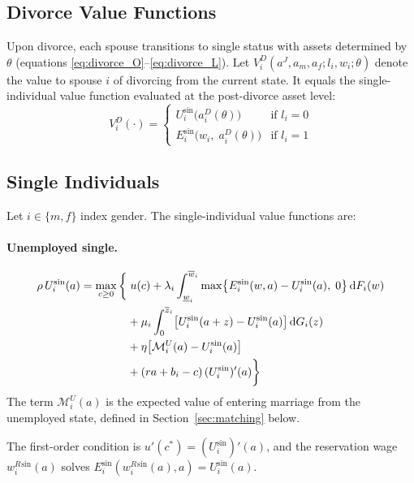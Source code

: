 \documentclass[11pt]{article}
\newcommand{\aJ}{a^{J}}
\newcommand{\wR}{w^{R}}
\newcommand{\dF}{\,\mathrm{d}F}
\newcommand{\dG}{\,\mathrm{d}G}
\begin{document}
\subsection{Divorce Value Functions}

Upon divorce, each spouse transitions to single status with assets determined by $\theta$ (equations \eqref{eq:divorce_O}--\eqref{eq:divorce_L}). Let $V_i^D(\aJ, a_m, a_f; l_i, w_i; \theta)$ denote the value to spouse $i$ of divorcing from the current state. It equals the single-individual value function evaluated at the post-divorce asset level:
\begin{equation}
    V_i^D(\cdot) = \begin{cases}
        U_i^{\sin}\!\bigl(a_i^D(\theta)\bigr) & \text{if } l_i = 0 \\
        E_i^{\sin}\!\bigl(w_i,\; a_i^D(\theta)\bigr) & \text{if } l_i = 1
    \end{cases}
    \label{eq:divorce_value}
\end{equation}

\subsection{Single Individuals}

Let $i \in \{m, f\}$ index gender. The single-individual value functions are:

\paragraph{Unemployed single.}
\begin{align}
    \rho\, U_i^{\sin}(a) = \max_{c \geq 0} \bigg\{
    &\; u(c)
    + \lambda_i \int_{\underline{w}_i}^{\overline{w}_i} \max\bigl\{E_i^{\sin}(w, a) - U_i^{\sin}(a),\; 0\bigr\} \dF_i(w) \notag\\
    &+ \mu_i \int_0^{\overline{z}_i} \bigl[U_i^{\sin}(a + z) - U_i^{\sin}(a)\bigr] \dG_i(z) \notag\\
    &+ \eta \bigl[\mathcal{M}_i^{U}(a) - U_i^{\sin}(a)\bigr] \notag\\
    &+ (ra + b_i - c)\, (U_i^{\sin})'(a)
    \bigg\}
    \label{eq:HJB_Usin}
\end{align}
The term $\mathcal{M}_i^U(a)$ is the expected value of entering marriage from the unemployed state, defined in Section~\ref{sec:matching} below.

The first-order condition is $u'(c^*) = (U_i^{\sin})'(a)$, and the reservation wage $\wR_i^{\sin}(a)$ solves $E_i^{\sin}(\wR_i^{\sin}(a), a) = U_i^{\sin}(a)$.
\end{document}
